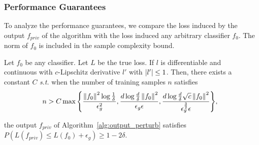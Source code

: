 \documentclass{article} %
\begin{document}
\subsubsection{Performance Guarantees}
To analyze the performance guarantees, we compare the loss induced by the output $f_{priv}$ of the algorithm with the loss induced any arbitrary classifier $f_0$. The norm of $f_0$ is included in the sample complexity bound.
\begin{theorem} Let $f_0$ be any classifier. Let $L$ be the true loss. If $l$ is differentiable and continuous with $c$-Lipschitz derivative $l'$ with $\left\lvert l'\right\rvert \le 1$. Then, there exists a constant $C$ \emph{s.t.} when the number of training samples $n$ satisfies
$$n > C\max{\left\{\frac{\left\lVert f_0\right\rVert^2 \log{\frac{1}{\delta}}}{\epsilon_g^2}, \frac{d\log{\frac{d}{\delta}}\left\lVert f_0\right\rVert^2}{\epsilon_g \epsilon}, \frac{d\log{\frac{d}{\delta}}\sqrt{c} \left\lVert f_0\right\rVert^2}{\epsilon_g^{\frac{3}{2}}\epsilon}\right\}},$$

the output $f_{priv}$ of Algorithm~\ref{alg:output_perturb} satisfies $P(L(f_{priv}) \le L(f_0) + \epsilon_g) \ge 1 - 2\delta$.
\end{theorem}
\end{document}
